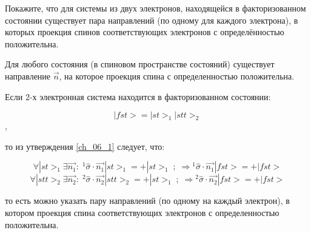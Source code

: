 \documentclass[__main__.tex]{subfiles}
\begin{document}
Покажите, что для системы из двух электронов, находящейся в факторизованном состоянии существует пара направлений (по одному для каждого электрона), в которых проекция спинов соответствующих электронов с определённостью положительна.\\ 

\begin{statement}
Для любого состояния (в спиновом пространстве состояний) существует направление $\vec{n}$, на которое проекция спина с определенностью положительна.
\label{ch_06_1}
\end{statement}

Если 2-х электронная система находится в факторизованном состоянии:

$$|fst> = |st>_1 |stt>_2$$,

то из утверждения \ref{ch_06_1} следует, что:

$$\forall |st>_1 \exists \vec{n_1}: \; {}^1\hat{\sigma} \cdot \vec{n_1} |st>_1 = +|st>_1 \; ; \; \Rightarrow {}^1\hat{\sigma} \cdot \vec{n_1} |fst> = +|fst>$$
$$\forall |stt>_2 \exists \vec{n_2}: \; {}^2\hat{\sigma} \cdot \vec{n_2} |stt>_2 = +|st>_1 \; ; \; \Rightarrow {}^2\hat{\sigma} \cdot \vec{n_2} |fst> = +|fst>$$

то есть можно указать пару направлений (по одному на каждый электрон), в котором проекция спина соответствующих электронов с определенностью положительна.
\end{document}
